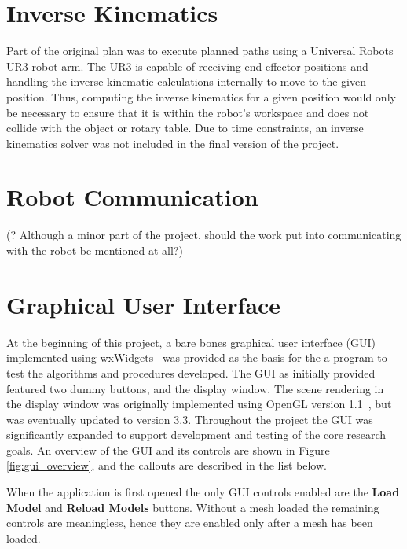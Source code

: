 \section{Inverse Kinematics}
Part of the original plan was to execute planned paths using a Universal Robots UR3 robot arm.
The UR3 is capable of receiving end effector positions and handling the inverse kinematic calculations internally to move to the given position.
Thus, computing the inverse kinematics for a given position would only be necessary to ensure that it is within the robot's workspace and does not collide with the object or rotary table.
Due to time constraints, an inverse kinematics solver was not included in the final version of the project.

\section{Robot Communication}
(? Although a minor part of the project, should the work put into communicating with the robot be mentioned at all?)

\section{Graphical User Interface}
At the beginning of this project, a bare bones graphical user interface (GUI) implemented using wxWidgets~\cite{wxWidgets} was provided as the basis for the a program to test the algorithms and procedures developed.
The GUI as initially provided featured two dummy buttons, and the display window.
The scene rendering in the display window was originally implemented using OpenGL version 1.1~\cite{OpenGL_wiki}, but was eventually updated to version 3.3.
Throughout the project the GUI was significantly expanded to support development and testing of the core research goals.
An overview of the GUI and its controls are shown in Figure \ref{fig:gui_overview}, and the callouts are described in the list below.

When the application is first opened the only GUI controls enabled are the \textbf{Load Model} and \textbf{Reload Models} buttons.
Without a mesh loaded the remaining controls are meaningless, hence they are enabled only after a mesh has been loaded.

